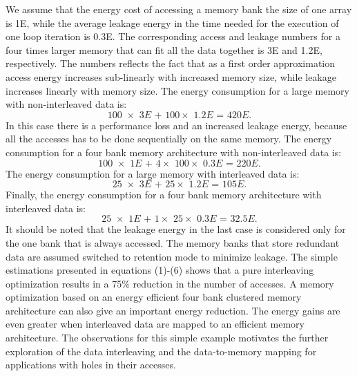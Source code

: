 \documentclass[prodmode,acmtecs]{acmsmall}
\begin{document}
We assume that the energy cost of accessing a memory bank the size of one array is 1E, while the average leakage energy in the time needed for the execution of one loop iteration is 0.3E. 
The corresponding access and leakage numbers for a four times larger memory that can fit all the data together is  3E and 1.2E, respectively. 
The numbers reflects the fact that as a first order approximation access energy increases sub-linearly with increased memory size, while leakage increases linearly with memory size. 
The energy consumption for a large memory with non-interleaved data is:
	\begin{equation}
		\textit{100 $\times$ 3E + 100$\times$ 1.2E = 420E}.
	\end{equation}	
In this case there is a performance loss and an increased leakage energy, because all the accesses has to be done sequentially on the same memory.	
The energy consumption for a four bank memory architecture with non-interleaved data is:
	\begin{equation}
		\textit{100 $\times$ 1E + 4$\times$ 100$\times$ 0.3E = 220E}.
	\end{equation}	
The energy consumption for a large memory with interleaved data is:
	\begin{equation}
		\textit{25 $\times$ 3E + 25$\times$ 1.2E = 105E}.
	\end{equation}	
Finally, the energy consumption for a four bank memory architecture with interleaved data is:
	\begin{equation}
		\textit{25 $\times$ 1E + 1$\times$ 25$\times$ 0.3E = 32.5E}.
	\end{equation}			
It should be noted that the leakage energy in the last case is considered only for the one bank that is always accessed.
The memory banks that store redundant data are assumed switched to retention mode to minimize leakage.
The simple estimations presented in equations (1)-(6) shows that a pure interleaving optimization results in a 75\% reduction in the number of accesses.
A memory optimization based on an energy efficient four bank clustered memory architecture can also give an important energy reduction.
The energy gains are even greater when interleaved data are mapped to an efficient memory architecture.
The observations for this simple example motivates the further exploration of the data interleaving and the data-to-memory mapping for applications with holes in their accesses. 
\end{document}

